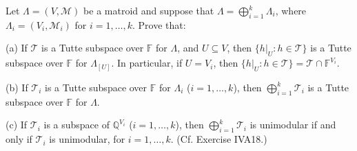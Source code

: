 Let $\Lambda = (V, \mathcal{M})$ be a matroid and suppose that $\Lambda = \bigoplus_{i=1}^{k} \Lambda_i$, where $\Lambda_i = (V_i, \mathcal{M}_i)$ for $i = 1, \ldots, k$. Prove that:

(a) If $\mathcal{T}$ is a Tutte subspace over $\mathbb{F}$ for $\Lambda$, and $U \subseteq V$, then $\{h|_{U} : h \in \mathcal{T}\}$ is a Tutte subspace over $\mathbb{F}$ for $\Lambda_{[U]}$. In particular, if $U = V_i$, then $\{h|_{U} : h \in \mathcal{T}\} = \mathcal{T} \cap \mathbb{F}^{V_i}$.

(b) If $\mathcal{T}_i$ is a Tutte subspace over $\mathbb{F}$ for $\Lambda_i$ ($i = 1, \ldots, k$), then $\bigoplus_{i=1}^{k} \mathcal{T}_i$ is a Tutte subspace over $\mathbb{F}$ for $\Lambda$.

(c) If $\mathcal{T}_i$ is a subspace of $\mathbb{Q}^{V_i}$ ($i = 1, \ldots, k$), then $\bigoplus_{i=1}^{k} \mathcal{T}_i$ is unimodular if and only if $\mathcal{T}_i$ is unimodular, for $i = 1, \ldots, k$. (Cf. Exercise IVA18.)
